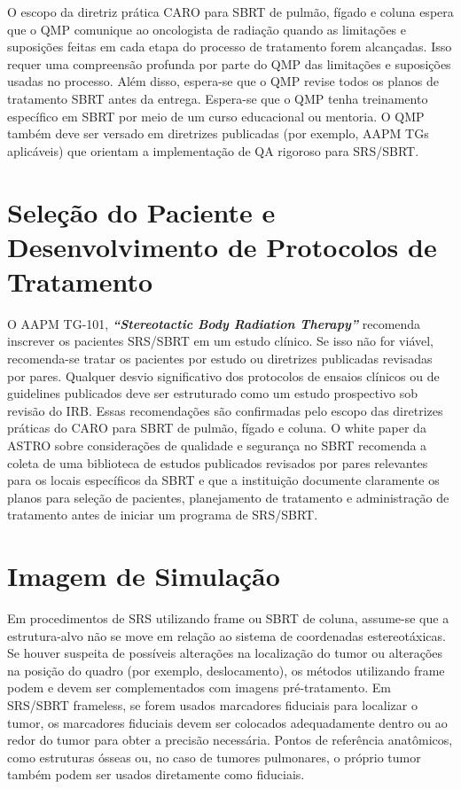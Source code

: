 \documentclass[11pt,a4paper]{article}
\newcounter{exemplo}
\begin{document}
	O escopo da diretriz prática CARO para SBRT de pulmão, fígado e coluna espera que o QMP comunique ao oncologista de radiação quando as limitações e suposições feitas em cada etapa do processo de tratamento forem alcançadas. Isso requer uma compreensão profunda por parte do QMP das limitações e suposições usadas no processo. Além disso, espera-se que o QMP revise todos os planos de tratamento SBRT antes da entrega. Espera-se que o QMP tenha treinamento específico em SBRT por meio de um curso educacional ou mentoria. O QMP também deve ser versado em diretrizes publicadas (por exemplo, AAPM TGs aplicáveis) que orientam a implementação de QA rigoroso para SRS/SBRT.

\section{Seleção do Paciente e Desenvolvimento de Protocolos de Tratamento}

	O AAPM TG-101, \textit{\textbf{``Stereotactic Body Radiation Therapy''}} recomenda inscrever os pacientes SRS/SBRT em um estudo clínico. Se isso não for viável, recomenda-se tratar os pacientes por estudo ou diretrizes publicadas revisadas por pares. Qualquer desvio significativo dos protocolos de ensaios clínicos ou de guidelines publicados deve ser estruturado como um estudo prospectivo sob revisão do IRB. Essas recomendações são confirmadas pelo escopo das diretrizes práticas do CARO para SBRT de pulmão, fígado e coluna. O white paper da ASTRO sobre considerações de qualidade e segurança no SBRT recomenda a coleta de uma biblioteca de estudos publicados revisados por pares relevantes para os locais específicos da SBRT e que a instituição documente claramente os planos para seleção de pacientes, planejamento de tratamento e administração de tratamento antes de iniciar um programa de SRS/SBRT.

\section{Imagem de Simulação}

	Em procedimentos de SRS utilizando frame ou SBRT de coluna, assume-se que a estrutura-alvo não se move em relação ao sistema de coordenadas estereotáxicas. Se houver suspeita de possíveis alterações na localização do tumor ou alterações na posição do quadro (por exemplo, deslocamento), os métodos utilizando frame podem e devem ser complementados com imagens pré-tratamento. Em SRS/SBRT frameless, se forem usados marcadores fiduciais para localizar o tumor, os marcadores fiduciais devem ser colocados adequadamente dentro ou ao redor do tumor para obter a precisão necessária. Pontos de referência anatômicos, como estruturas ósseas ou, no caso de tumores pulmonares, o próprio tumor também podem ser usados diretamente como fiduciais.
\end{document}
